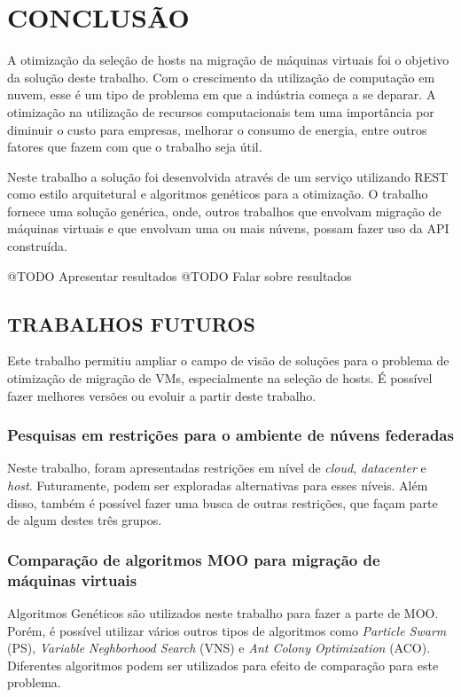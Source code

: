 \chapter{CONCLUSÃO}
\label{chap:conclusao}
A otimização da seleção de hosts na migração de máquinas virtuais
foi o objetivo da solução deste trabalho. Com o crescimento da 
utilização de computação em nuvem, esse é um tipo de problema em que
a indústria começa a se deparar. A otimização na utilização de recursos 
computacionais tem uma importância por diminuir o custo para empresas,
melhorar o consumo de energia, entre outros fatores que fazem com que 
o trabalho seja útil.

Neste trabalho a solução foi desenvolvida através de um serviço utilizando REST 
como estilo arquitetural e algoritmos genéticos para a otimização. 
O trabalho fornece uma solução genérica, onde, outros trabalhos que 
envolvam migração de máquinas virtuais e que envolvam uma ou mais núvens, 
possam fazer uso da API construída. 

@TODO Apresentar resultados
@TODO Falar sobre resultados

\section{TRABALHOS FUTUROS}
\label{sec:trabalhosFuturos}

Este trabalho permitiu ampliar o campo de visão de soluções para
o problema de otimização de migração de VMs, especialmente na seleção
de hosts. É possível fazer melhores versões ou evoluir a partir deste trabalho.

\subsection{Pesquisas em restrições para o ambiente de núvens federadas}

Neste trabalho, foram apresentadas restrições em nível de \textit{cloud},
\textit{datacenter} e \textit{host}. Futuramente, podem ser exploradas
alternativas para esses níveis. Além disso, também é possível fazer
uma busca de outras restrições, que façam parte de algum destes
três grupos.

\subsection{Comparação de algoritmos MOO para migração de máquinas virtuais}

Algoritmos Genéticos são utilizados neste trabalho para fazer a parte
de MOO. Porém, é possível utilizar vários outros tipos de algoritmos como
\textit{Particle Swarm} (PS), \textit{Variable Neghborhood Search} (VNS) e
\textit{Ant Colony Optimization} (ACO). Diferentes algoritmos podem ser utilizados 
para efeito de comparação para este problema. 


